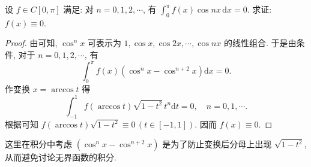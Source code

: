 \documentclass[../../main.tex]{subfiles}%
\begin{document}
\begin{example}
设 \( f \in C[0,\pi] \) 满足: 对 \( n = 0,1,2,\cdots \), 有 \( \int_{0}^{\pi} f(x)\cos nx \, \mathrm{d}x = 0 \). 求证: \( f(x) \equiv 0 \).
\end{example}
\begin{proof}

由可知, \( \cos^n x \) 可表示为 \( 1,\cos x,\cos 2x,\cdots,\cos nx \) 的线性组合. 于是由条件, 对于 \( n = 0,1,2,\cdots \), 有
\[
\int_{0}^{\pi} f(x) \left( \cos^n x - \cos^{n + 2} x \right) \mathrm{d}x = 0.
\]
作变换 \( x = \arccos t \) 得
\[
\int_{-1}^{1} f(\arccos t) \sqrt{1 - t^2} \, t^n \mathrm{d}t = 0, \quad n = 0,1,\cdots.
\]
根据可知 \( f(\arccos t) \sqrt{1 - t^2} \equiv 0 \, (t \in [-1,1]) \). 因而 \( f(x) \equiv 0 \).

\end{proof}
\begin{remark}
这里在积分中考虑 \( (\cos^n x - \cos^{n + 2} x) \) 是为了防止变换后分母上出现 \( \sqrt{1 - t^2} \), 从而避免讨论无界函数的积分.
\end{remark}
\end{document}

